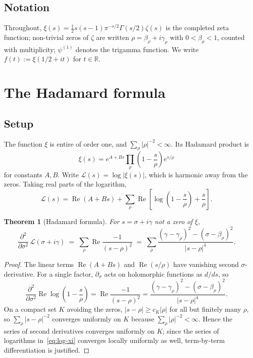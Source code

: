 \documentclass[11pt]{amsart}
\newtheorem{theorem}{Theorem}[section]
\renewcommand{\Re}{\operatorname{Re}}
\begin{document}
\subsection*{Notation}
Throughout, $\xi(s) = \frac{1}{2}s(s-1)\pi^{-s/2}\Gamma(s/2)\zeta(s)$ is the completed
zeta function; non-trivial zeros of $\zeta$ are written $\rho = \beta_\rho + i\gamma_\rho$
with $0 < \beta_\rho < 1$, counted with multiplicity; $\psi^{(1)}$ denotes the trigamma
function. We write $f(t) := \xi(1/2+it)$ for $t \in \mathbb{R}$.

\section{The Hadamard formula}
\label{sec:curvature}

\subsection{Setup}

The function $\xi$ is entire of order one, and $\sum_\rho|\rho|^{-2}<\infty$. Its Hadamard
product is
\begin{equation}\label{eq:hadamard}
  \xi(s) = e^{A+Bs}\prod_\rho\!\left(1-\frac{s}{\rho}\right)e^{s/\rho}
\end{equation}
for constants $A,B$. Write $\mathcal{L}(s) = \log|\xi(s)|$, which is harmonic away from the
zeros. Taking real parts of the logarithm,
\begin{equation}\label{eq:log-xi}
  \mathcal{L}(s) = \Re(A+Bs) + \sum_\rho \Re\!\left[\log\!\left(1-\frac{s}{\rho}\right)+\frac{s}{\rho}\right].
\end{equation}

\begin{theorem}[Hadamard formula]\label{thm:curvature}
For $s = \sigma + i\gamma$ not a zero of $\xi$,
\begin{equation}\label{eq:curvature-cartesian}
  \frac{\partial^2}{\partial\sigma^2}\,\mathcal{L}(\sigma+i\gamma)
  \;=\;\sum_\rho\Re\frac{-1}{(s-\rho)^2}\;=\;
  \sum_\rho \frac{(\gamma-\gamma_\rho)^2 - (\sigma-\beta_\rho)^2}{|s-\rho|^4}.
\end{equation}
\end{theorem}

\begin{proof}
The linear terms $\Re(A+Bs)$ and $\Re(s/\rho)$ have vanishing second $\sigma$-derivative.
For a single factor, $\partial_\sigma$ acts on holomorphic functions as $d/ds$, so
\[
  \frac{\partial^2}{\partial\sigma^2}\Re\log\!\left(1-\frac{s}{\rho}\right)
  = \Re\frac{-1}{(s-\rho)^2}
  = \frac{(\gamma-\gamma_\rho)^2-(\sigma-\beta_\rho)^2}{|s-\rho|^4}.
\]
On a compact set $K$ avoiding the zeros, $|s-\rho|\ge c_K|\rho|$ for all but finitely many
$\rho$, so $\sum_\rho|s-\rho|^{-2}$ converges uniformly on $K$ because
$\sum_\rho|\rho|^{-2}<\infty$. Hence the series of second derivatives converges uniformly on
$K$; since the series of logarithms in~\eqref{eq:log-xi} converges locally uniformly as well,
term-by-term differentiation is justified.
\end{proof}
\end{document}
